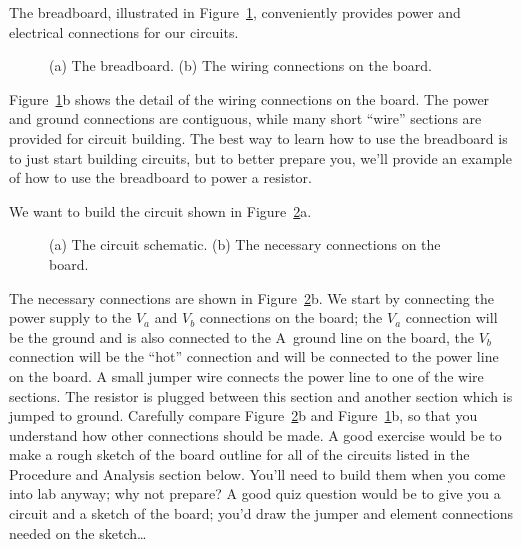 The breadboard, illustrated in Figure~\ref{fig:DC:breadboard}, conveniently 
provides power and electrical connections for our circuits.   
\begin{figure}
\centerline{\epsfysize=17cm  
\hspace*{1cm} \epsfysize=16cm } 
\caption{(a) The breadboard. (b) The wiring connections on the board.}
\label{fig:DC:breadboard}
\end{figure}
Figure~\ref{fig:DC:breadboard}b shows the detail of the wiring connections on
the board. The power and ground connections are contiguous, while many short
``wire'' sections are provided for circuit building.  The best way to learn how
to use the breadboard is to just start building circuits, but to better 
prepare you, we'll provide an example of how to use the breadboard to power a 
resistor. 

We want to build the circuit shown in Figure~\ref{fig:DC:exampleboard}a.
\begin{figure}
\centerline{\epsfysize=16cm } 
\caption{(a) The circuit schematic. (b) The necessary connections on the 
board.}
\label{fig:DC:exampleboard}
\end{figure}
The necessary connections are shown in Figure~\ref{fig:DC:exampleboard}b. We 
start by connecting the power supply to the $V_a$ and $V_b$ connections on the 
board; the $V_a$ connection will be the ground and is also connected to the
A~ground line on the board, the $V_b$ connection will be the ``hot'' connection
and will be connected to the power line on the board.  A small jumper wire
connects the power line to one of the wire sections.  The resistor is plugged
between this section and another section which is jumped to ground. Carefully
compare Figure~\ref{fig:DC:exampleboard}b and Figure~\ref{fig:DC:breadboard}b,
so that you understand how other connections should be made.  A good exercise
would be to make a rough sketch of the board outline for all of the circuits
listed in the Procedure and Analysis section below.  You'll need to build them
when you come into lab anyway; why not prepare? A good quiz question would be 
to give you a circuit and a sketch of the board; you'd draw the jumper and
element connections needed on the sketch\ldots 

\vfill
\pagebreak
 







